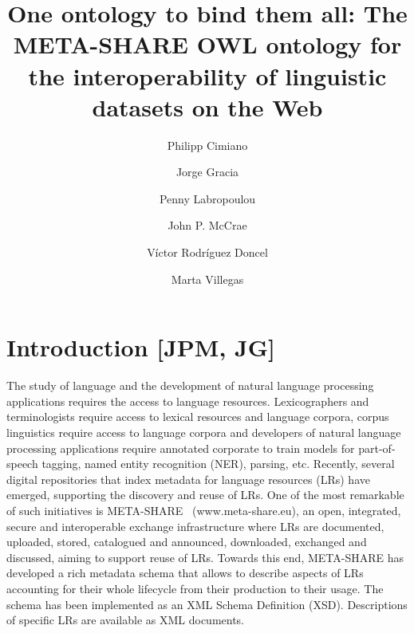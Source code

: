 \documentclass{llncs}
\begin{document}
\title{One ontology to bind them all: The META-SHARE OWL ontology for the interoperability of linguistic datasets on the Web}
%
%
\author{Philipp Cimiano \and Jorge Gracia \and Penny Labropoulou \and John P. McCrae \and V\'ictor Rodr\'iguez Doncel \and Marta Villegas}
%
%
%
\maketitle %
\begin{abstract}
\end{abstract}


\section{Introduction [JPM, JG]}
\label{sec:introduction}

The study of language and the development of natural language processing applications requires the access to language resources. Lexicographers and terminologists require access to lexical resources and language corpora, corpus linguistics require access to language corpora and developers of natural language processing applications require annotated corporate to train models for part-of-speech tagging, named entity recognition (NER), parsing, etc. 
Recently, several digital repositories that index metadata for language resources (LRs) have emerged, supporting the discovery and reuse of LRs. One of the most remarkable of such initiatives is META-SHARE~\cite{piperidis2012meta} (www.meta-share.eu), an open, integrated, secure and interoperable exchange infrastructure where LRs are documented, uploaded, stored, catalogued and announced, downloaded, exchanged and discussed, aiming to support reuse of LRs. Towards this end, META-SHARE has developed a rich metadata schema that allows to describe aspects of LRs accounting for their whole lifecycle from their production to their usage. The schema has been implemented as an XML Schema Definition (XSD). Descriptions of specific LRs are available as XML documents.
\end{document}
